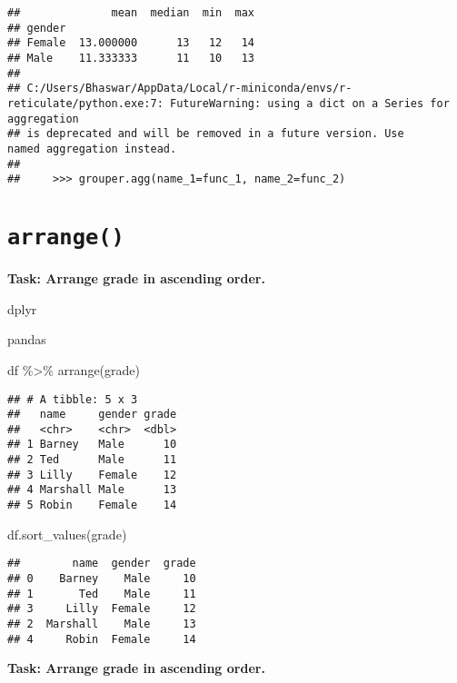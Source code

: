 \documentclass[
]{book}
\newenvironment{Shaded}{\begin{snugshade}}{\end{snugshade}}
\newcommand{\FunctionTok}[1]{\textcolor[rgb]{0.00,0.00,0.00}{#1}}
\newcommand{\NormalTok}[1]{#1}
\newcommand{\SpecialCharTok}[1]{\textcolor[rgb]{0.00,0.00,0.00}{#1}}
\newcommand{\StringTok}[1]{\textcolor[rgb]{0.31,0.60,0.02}{#1}}
\begin{document}
\begin{verbatim}
##              mean  median  min  max
## gender                             
## Female  13.000000      13   12   14
## Male    11.333333      11   10   13
## 
## C:/Users/Bhaswar/AppData/Local/r-miniconda/envs/r-reticulate/python.exe:7: FutureWarning: using a dict on a Series for aggregation
## is deprecated and will be removed in a future version. Use                 named aggregation instead.
## 
##     >>> grouper.agg(name_1=func_1, name_2=func_2)
\end{verbatim}

\hypertarget{arrange}{%
\section{\texorpdfstring{\texttt{arrange()}}{arrange()}}\label{arrange}}

{\textbf{Task: Arrange grade in ascending order.
}}

dplyr

pandas

\begin{Shaded}
\begin{Highlighting}[]
\NormalTok{df }\SpecialCharTok{\%\textgreater{}\%} 
  \FunctionTok{arrange}\NormalTok{(grade)}
\end{Highlighting}
\end{Shaded}

\begin{verbatim}
## # A tibble: 5 x 3
##   name     gender grade
##   <chr>    <chr>  <dbl>
## 1 Barney   Male      10
## 2 Ted      Male      11
## 3 Lilly    Female    12
## 4 Marshall Male      13
## 5 Robin    Female    14
\end{verbatim}

\begin{Shaded}
\begin{Highlighting}[]
\NormalTok{df.sort\_values(}\StringTok{\textquotesingle{}grade\textquotesingle{}}\NormalTok{)}
\end{Highlighting}
\end{Shaded}

\begin{verbatim}
##        name  gender  grade
## 0    Barney    Male     10
## 1       Ted    Male     11
## 3     Lilly  Female     12
## 2  Marshall    Male     13
## 4     Robin  Female     14
\end{verbatim}

{\textbf{Task: Arrange grade in ascending order.
}}
\end{document}
